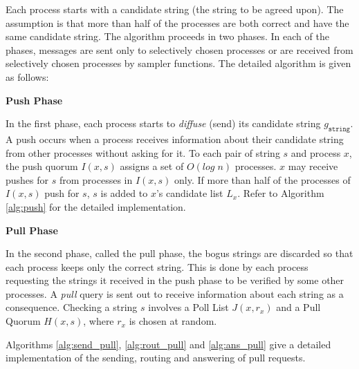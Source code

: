 Each process starts with a candidate string (the string to be agreed upon). The assumption is that more than half of the processes are both correct and have the same candidate string. The algorithm proceeds in two phases. In each of the phases, messages are sent only to selectively chosen processes or are received from selectively chosen processes by sampler functions. The detailed algorithm is given as follows:



\textbf{Push Phase}

 In the first phase, each process starts to \textit{diffuse} (send) its candidate string $g_{\mathtt{string}}$. A push occurs when a process receives information about their candidate string from other processes without asking for it. To each pair of string $s$ and process $x$, the push quorum $I(x,s)$ assigns a set of $O(log\;n)$ processes. $x$ may receive pushes for $s$ from processes in $I(x,s)$ only. If more than half of the processes of $I(x,s)$ push for $s$, $s$ is added to $x$'s candidate list $L_x$. Refer to Algorithm \ref{alg:push} for the detailed implementation.








\textbf{Pull Phase}

In the second phase, called the pull phase, the bogus strings are discarded so that each process keeps only the correct string. This is done by each process requesting the strings it received in the push phase to be verified by some other processes. A \textit{pull} query is sent out to receive information about each string as a consequence. Checking a string $s$ involves a Poll List $J(x, r_x)$ and a Pull Quorum $H(x, s)$, where $r_x$ is chosen at random. 


Algorithms \ref{alg:send_pull}, \ref{alg:rout_pull} and \ref{alg:ans_pull} give a detailed implementation of the sending, routing and answering of pull requests.

